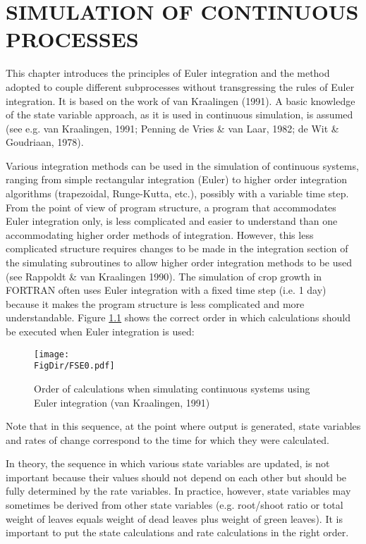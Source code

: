 \chapter{SIMULATION OF CONTINUOUS PROCESSES}

This chapter introduces the principles of Euler integration and the method adopted to
couple different subprocesses without transgressing the rules of Euler integration. It is
based on the work of van Kraalingen (1991). A basic knowledge of the state variable
approach, as it is used in continuous simulation, is assumed (see e.g. van Kraalingen,
1991; Penning de Vries \& van Laar, 1982; de Wit \& Goudriaan, 1978).

Various integration methods can be used in the simulation of continuous systems, ranging
from simple rectangular integration (Euler) to higher order integration algorithms 
(trapezoidal, Runge-Kutta, etc.), possibly with a variable time step. From the point of 
view of program structure, a program that accommodates Euler integration only, is less 
complicated and easier to understand than one accommodating higher order methods of 
integration. However, this less complicated structure requires changes to be made in the
integration section of the simulating subroutines to allow higher order integration methods
to be used (see Rappoldt \& van Kraalingen 1990). The simulation of crop growth in
FORTRAN often uses Euler integration with a fixed time step (i.e. 1 day) because it
makes the program structure is less complicated and more understandable. Figure \ref{fig:euler}
shows the correct order in which calculations should be executed when Euler integration
is used:

\begin{figure}[p]
\centering
\texttt{[image: \\FigDir/FSE0.pdf]}
\caption{Order of calculations when simulating continuous systems using Euler 
         integration (van Kraalingen, 1991)}
\label{fig:euler}
\end{figure}

Note that in this sequence, at the point where output is generated, state variables and rates
of change correspond to the time for which they were calculated. 

In theory, the sequence in which various state variables are updated, is not important
because their values should not depend on each other but should be fully determined by
the rate variables. In practice, however, state variables may sometimes be derived from
other state variables (e.g. root/shoot ratio or total weight of leaves equals weight of dead
leaves plus weight of green leaves). It is important to put the state calculations and rate
calculations in the right order.

